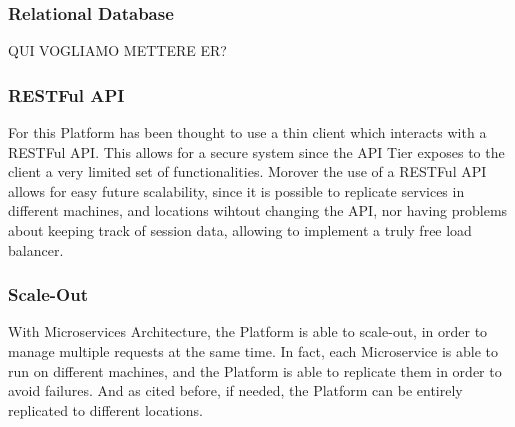 \subsubsection{Relational Database}
QUI VOGLIAMO METTERE ER?
\subsubsection{RESTFul API} \label{parr:restful}
For this Platform has been thought to use a thin client which interacts with a RESTFul API. This allows for a secure system since the API Tier exposes to the client a very limited set of functionalities. 
Morover the use of a RESTFul API allows for easy future scalability, since it is possible to replicate services in different machines, and locations wihtout changing the API, nor having problems about keeping track of session data, allowing to implement a truly free load balancer. 
\subsubsection{Scale-Out}
With Microservices Architecture, the Platform is able to scale-out, in order to manage multiple requests at the same time. In fact, each Microservice is able to run on different machines, and the Platform is able to replicate them in order to avoid failures. And as cited before, if needed, the Platform can be entirely replicated to different locations.
